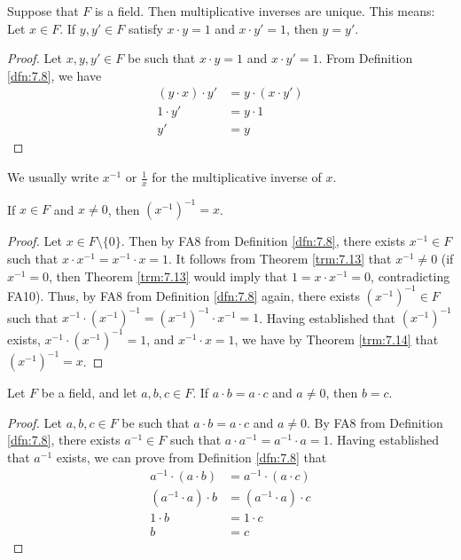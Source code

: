 \documentclass[../main.tex]{subfiles}
\begin{document}
\begin{theorem}\label{trm:7.14}
    Suppose that $F$ is a field. Then multiplicative inverses are unique. This means: Let $x\in F$. If $y,y'\in F$ satisfy $x\cdot y=1$ and $x\cdot y'=1$, then $y=y'$.
    \begin{proof}
        Let $x,y,y'\in F$ be such that $x\cdot y=1$ and $x\cdot y'=1$. From Definition \ref{dfn:7.8}, we have
        \begin{align*}
            (y\cdot x)\cdot y' &= y\cdot (x\cdot y')\tag*{FA6}\\
            1 \cdot y' &= y\cdot 1\tag*{FA8}\\
            y' &= y\tag*{FA7}
        \end{align*}
    \end{proof}
\end{theorem}

We usually write $x^{-1}$ or $\frac{1}{x}$ for the multiplicative inverse of $x$.

\begin{corollary}\label{cly:7.15}
    If $x\in F$ and $x\neq 0$, then $(x^{-1})^{-1}=x$.
    \begin{proof}
        Let $x\in F\setminus\{0\}$. Then by FA8 from Definition \ref{dfn:7.8}, there exists $x^{-1}\in F$ such that $x\cdot x^{-1}=x^{-1}\cdot x=1$. It follows from Theorem \ref{trm:7.13} that $x^{-1}\neq 0$ (if $x^{-1}=0$, then Theorem \ref{trm:7.13} would imply that $1=x\cdot x^{-1}=0$, contradicting FA10). Thus, by FA8 from Definition \ref{dfn:7.8} again, there exists $(x^{-1})^{-1}\in F$ such that $x^{-1}\cdot(x^{-1})^{-1}=(x^{-1})^{-1}\cdot x^{-1}=1$. Having established that $(x^{-1})^{-1}$ exists, $x^{-1}\cdot(x^{-1})^{-1}=1$, and $x^{-1}\cdot x=1$, we have by Theorem \ref{trm:7.14} that $(x^{-1})^{-1}=x$.
    \end{proof}
\end{corollary}

\begin{theorem}\label{trm:7.16}
    Let $F$ be a field, and let $a,b,c\in F$. If $a\cdot b=a\cdot c$ and $a\neq 0$, then $b=c$.
    \begin{proof}
        Let $a,b,c\in F$ be such that $a\cdot b=a\cdot c$ and $a\neq 0$. By FA8 from Definition \ref{dfn:7.8}, there exists $a^{-1}\in F$ such that $a\cdot a^{-1}=a^{-1}\cdot a=1$. Having established that $a^{-1}$ exists, we can prove from Definition \ref{dfn:7.8} that
        \begin{align*}
            a^{-1}\cdot(a\cdot b) &= a^{-1}\cdot(a\cdot c)\\
            (a^{-1}\cdot a)\cdot b &= (a^{-1}\cdot a)\cdot c\tag*{FA6}\\
            1\cdot b &= 1\cdot c\tag*{FA8}\\
            b &= c\tag*{FA7}
        \end{align*}
    \end{proof}
\end{theorem}
\end{document}
